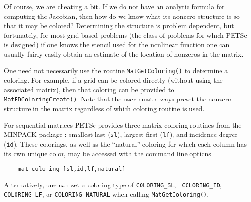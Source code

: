  
 

Of course, we are cheating a bit. If we do not have an analytic
formula for computing the Jacobian, then how do we know what its
nonzero structure is so that it may be colored?  Determining the
structure is problem dependent, but fortunately, for most grid-based
problems (the class of problems for which PETSc is designed) if one
knows the stencil used for the nonlinear function one can usually
fairly easily obtain an estimate of the location of nonzeros in
the matrix.

One need not necessarily use the routine {\tt MatGetColoring()} to
determine a coloring.  For example, if a grid can be colored directly
(without using the associated matrix), then that coloring can be provided
to {\tt MatFDColoringCreate()}.  Note that the user must always
preset the nonzero structure in the matrix regardless of which
coloring routine is used.

For sequential matrices PETSc provides three matrix coloring routines from the 
MINPACK package \cite{more84}: smallest-last ({\tt sl}), largest-first ({\tt lf}),
and incidence-degree ({\tt id}).  These colorings, as well as the ``natural'' coloring 
for which each column has its own unique color, may be accessed with the command line options
\begin{verbatim}
   -mat_coloring [sl,id,lf,natural]
\end{verbatim}
Alternatively, one can set a coloring type of {\tt COLORING\_SL}, {\tt
COLORING\_ID}, {\tt COLORING\_LF}, or {\tt COLORING\_NATURAL} 
when calling {\tt MatGetColoring()}.   
 

